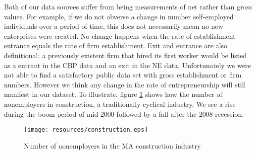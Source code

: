 \documentclass[12pt]{article}
\begin{document}
\begin{comment}

Our second source of data is the Census Country Business Patterns (CBP). The CBP is an annual series based on the Census Business Register, a dataset of US firms that is continuously updated using multiple methods including surveys and tax reporting. The CBP provides country level information on for example the industry, sales and employee count of establishments. It excludes businesses with no paid employees. As shown in Figure \ref{fig:firm_est}, establishments closely track firms. Although we are primarily interested in new firm creation, the census does not publicly provide firm level data at the industry level per county. We use establishments of 1 to 4 employees (small establishments) as a proxy for entrepreneurial firms. 

\begin{figure}[H]
	\centering
	\texttt{[image: resources/firm\_est\_MA.eps]}
	\caption{Number of firms and establishments in Massachusetts with 1 to 4 employees}
	\label{fig:firm_est}
\end{figure}

Our third source of data is the Nonemployer Statistics series. The NS is based on tax filings. It includes self-employed individuals as well incorporated businesses and partnerships that lack employees. 

\end{comment}

Both of our data sources suffer from being measurements of net rather than gross values. For example, if  we do not obverse a change in number self-employed individuals over a period of time, this does not necessarily mean no new enterprises were created. No change happens when the rate of establishment entrance equals the rate of firm establishment. Exit and entrance are also definitional; a previously existent firm that hired its first worker would be listed as a entrant in the CBP data and an exit in the NE data. Unfortunately we were not able to find a satisfactory public data set with gross establishment or firm numbers. However we think any change in the rate of entrepreneurship will still manifest in our dataset. To illustrate, figure \ref{fig:construct} shows how the number of nonemployers in construction, a traditionally cyclical industry. We see a rise during the boom period of mid-2000 followed by a fall after the 2008 recession. 

\begin{figure}[H]
	\centering
	\texttt{[image: resources/construction.eps]}
	\caption{Number of nonemployers in the MA construction industry}
	\label{fig:construct}
\end{figure}
\end{document}
